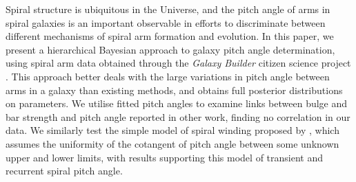 Spiral structure is ubiquitous in the Universe, and the pitch angle of arms in spiral galaxies is an important observable in efforts to discriminate between different mechanisms of spiral arm formation and evolution. In this paper, we present a hierarchical Bayesian approach to galaxy pitch angle determination, using spiral arm data obtained through the \textit{Galaxy Builder} citizen science project \citep{2020arXiv200610450L}. This approach better deals with the large variations in pitch angle between arms in a galaxy than existing methods, and obtains full posterior distributions on parameters. We utilise fitted pitch angles to examine links between bulge and bar strength and pitch angle reported in other work, finding no correlation in our data. We similarly test the simple model of spiral winding proposed by \citet{2019arXiv190910291P}, which assumes the uniformity of the cotangent of pitch angle between some unknown upper and lower limits, with results supporting this model of transient and recurrent spiral pitch angle.
